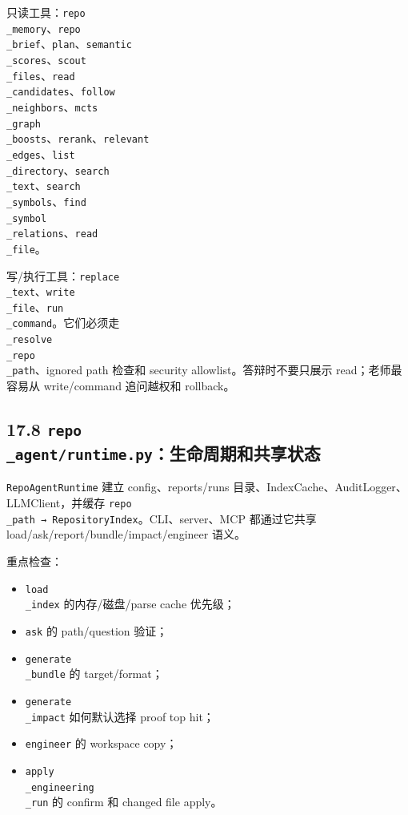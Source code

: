 \documentclass[UTF8,12pt,openany]{ctexbook}
\begin{document}
只读工具：\texttt{repo\\_memory}、\texttt{repo\\_brief}、\texttt{plan}、\texttt{semantic\\_scores}、\texttt{scout\\_files}、\texttt{read\\_candidates}、\texttt{follow\\_neighbors}、\texttt{mcts\\_graph\\_boosts}、\texttt{rerank}、\texttt{relevant\\_edges}、\texttt{list\\_directory}、\texttt{search\\_text}、\texttt{search\\_symbols}、\texttt{find\\_symbol\\_relations}、\texttt{read\\_file}。\par

写/执行工具：\texttt{replace\\_text}、\texttt{write\\_file}、\texttt{run\\_command}。它们必须走 \texttt{\\_resolve\\_repo\\_path}、ignored path 检查和 security allowlist。答辩时不要只展示 read；老师最容易从 write/command 追问越权和 rollback。\par

\subsection{17.8 \texttt{repo\\_agent/runtime.py}：生命周期和共享状态}

\texttt{RepoAgentRuntime} 建立 config、reports/runs 目录、IndexCache、AuditLogger、LLMClient，并缓存 \texttt{repo\\_path → RepositoryIndex}。CLI、server、MCP 都通过它共享 load/ask/report/bundle/impact/engineer 语义。\par

重点检查：\par

\begin{itemize}
\item \texttt{load\\_index} 的内存/磁盘/parse cache 优先级；
\item \texttt{ask} 的 path/question 验证；
\item \texttt{generate\\_bundle} 的 target/format；
\item \texttt{generate\\_impact} 如何默认选择 proof top hit；
\item \texttt{engineer} 的 workspace copy；
\item \texttt{apply\\_engineering\\_run} 的 confirm 和 changed file apply。
\end{itemize}
\end{document}
